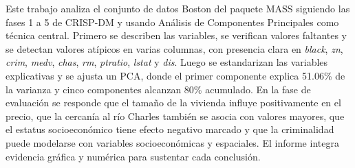 Este trabajo analiza el conjunto de datos Boston del paquete MASS siguiendo las fases 1 a 5 de CRISP-DM y usando An\'alisis de Componentes Principales como t\'ecnica central. Primero se describen las variables, se verifican valores faltantes y se detectan valores at\'ipicos en varias columnas, con presencia clara en 
\textit{black}, 
\textit{zn}, 
\textit{crim}, 
\textit{medv}, 
\textit{chas}, 
\textit{rm}, 
\textit{ptratio}, 
\textit{lstat} y 
\textit{dis}. Luego se estandarizan las variables explicativas y se ajusta un PCA, donde el primer componente explica 51.06\% de la varianza y cinco componentes alcanzan 80\% acumulado. En la fase de evaluaci\'on se responde que el tama\~no de la vivienda influye positivamente en el precio, que la cercan\'ia al r\'io Charles tambi\'en se asocia con valores mayores, que el estatus socioecon\'omico tiene efecto negativo marcado y que la criminalidad puede modelarse con variables socioecon\'omicas y espaciales. El informe integra evidencia gr\'afica y num\'erica para sustentar cada conclusi\'on.